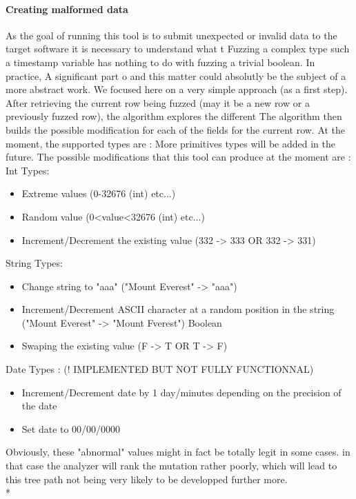 \documentclass{article}
\begin{document}
				\paragraph{Creating malformed data} 
As the goal of running this tool is to submit unexpected or invalid data to the target software it is necessary to understand what t
Fuzzing a complex type such a timestamp variable has nothing to do with fuzzing a trivial boolean. In practice, A significant part o
and this matter could absolutly be the subject of a more abstract work. We focused here on a very simple approach (as a first step).
After retrieving the current row being fuzzed (may it be a new row or a previously fuzzed row), the algorithm explores the different
The algorithm then builds the possible modification for each of the fields for the current row.
At the moment, the supported types are : %
More primitives types will be added in the future.
The possible modifications that this tool can produce at the moment are : %
				Int Types:
				\begin{itemize}
		
					\item Extreme values (0-32676 (int) etc...)
					\item Random value (0<value<32676 (int) etc...)
					\item Increment/Decrement the existing value (332 -> 333 OR 332 -> 331)
				\end{itemize}
				String Types:
				\begin{itemize}
			
					\item Change string to "aaa" ("Mount Everest" -> "aaa")
					\item Increment/Decrement ASCII character at a random position in the string ("Mount Everest" -> "Mount Fverest")
					Boolean
					\item Swaping the existing value (F -> T OR T -> F)
					\end{itemize}
					Date Types : (! IMPLEMENTED BUT NOT FULLY FUNCTIONNAL)					
					\begin{itemize}
					\item Increment/Decrement date by 1 day/minutes depending on the precision of the date
					\item Set date to 00/00/0000
				\end{itemize}
Obviously, these "abnormal" values might in fact be totally legit in some cases. in that case the analyzer 
will rank the mutation rather poorly, which will lead to this tree path not being very likely to be developped further more.
				\\*
\end{document}

